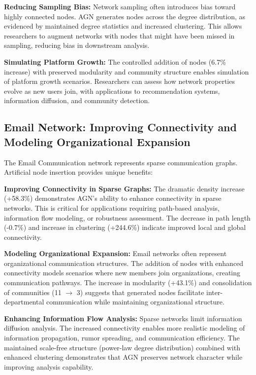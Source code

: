 \documentclass[12pt]{article}
\begin{document}
\textbf{Reducing Sampling Bias:} Network sampling often introduces bias toward highly connected nodes. AGN generates nodes across the degree distribution, as evidenced by maintained degree statistics and increased clustering. This allows researchers to augment networks with nodes that might have been missed in sampling, reducing bias in downstream analysis.

\textbf{Simulating Platform Growth:} The controlled addition of nodes (6.7\% increase) with preserved modularity and community structure enables simulation of platform growth scenarios. Researchers can assess how network properties evolve as new users join, with applications to recommendation systems, information diffusion, and community detection.

\subsection{Email Network: Improving Connectivity and Modeling Organizational Expansion}

The Email Communication network represents sparse communication graphs. Artificial node insertion provides unique benefits:

\textbf{Improving Connectivity in Sparse Graphs:} The dramatic density increase (+58.3\%) demonstrates AGN's ability to enhance connectivity in sparse networks. This is critical for applications requiring path-based analysis, information flow modeling, or robustness assessment. The decrease in path length (-0.7\%) and increase in clustering (+244.6\%) indicate improved local and global connectivity.

\textbf{Modeling Organizational Expansion:} Email networks often represent organizational communication structures. The addition of nodes with enhanced connectivity models scenarios where new members join organizations, creating communication pathways. The increase in modularity (+43.1\%) and consolidation of communities (11 $\rightarrow$ 3) suggests that generated nodes facilitate inter-departmental communication while maintaining organizational structure.

\textbf{Enhancing Information Flow Analysis:} Sparse networks limit information diffusion analysis. The increased connectivity enables more realistic modeling of information propagation, rumor spreading, and communication efficiency. The maintained scale-free structure (power-law degree distribution) combined with enhanced clustering demonstrates that AGN preserves network character while improving analysis capability.
\end{document}
